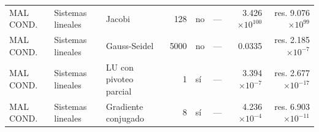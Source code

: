 {\begin{longtable}{lllrlrrr}
MAL COND. & Sistemas lineales & Jacobi & 128 & no & — & 3.426$\times10^{100}$ & res. 9.076$\times10^{99}$ \\
MAL COND. & Sistemas lineales & Gauss-Seidel & 5000 & no & — & 0.0335 & res. 2.185$\times10^{-7}$ \\
MAL COND. & Sistemas lineales & LU con pivoteo parcial & 1 & sí & — & 3.394$\times10^{-7}$ & res. 2.677$\times10^{-17}$ \\
MAL COND. & Sistemas lineales & Gradiente conjugado & 8 & sí & — & 4.236$\times10^{-4}$ & res. 6.903$\times10^{-11}$ \\
\bottomrule
\end{longtable}
}
